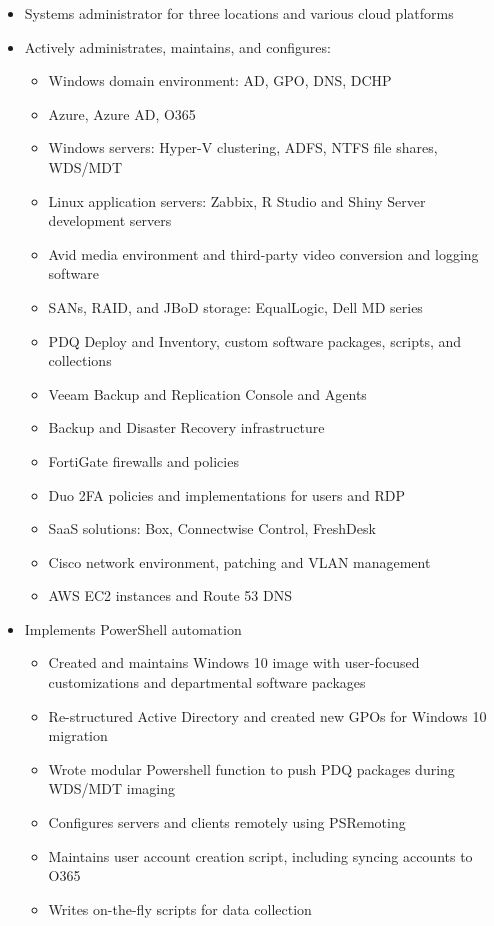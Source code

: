 \documentclass[centered]{res}
\begin{document}
\begin{resume}
\begin{itemize}
\item Systems administrator for three locations and various cloud platforms
\item Actively administrates, maintains, and configures:
	\begin{itemize}
		\item Windows domain environment: AD, GPO, DNS, DCHP
		\item Azure, Azure AD, O365 
		\item Windows servers: Hyper-V clustering, ADFS, NTFS file shares, WDS/MDT
		\item Linux application servers: Zabbix, R Studio and Shiny Server development servers
		\item Avid media environment and third-party video conversion and logging software
		\item SANs, RAID, and JBoD storage: EqualLogic, Dell MD series
		\item PDQ Deploy and Inventory, custom software packages, scripts, and collections
		\item Veeam Backup and Replication Console and Agents
		\item Backup and Disaster Recovery infrastructure
		\item FortiGate firewalls and policies
		\item Duo 2FA policies and implementations for users and RDP
		\item SaaS solutions: Box, Connectwise Control, FreshDesk
		\item Cisco network environment, patching and VLAN management		
		\item AWS EC2 instances and Route 53 DNS
	\end{itemize}
\item Implements PowerShell automation
	\begin{itemize}
	\item Created and maintains Windows 10 image with user-focused customizations and departmental software packages
	\item Re-structured Active Directory and created new GPOs for Windows 10 migration
	\item Wrote modular Powershell function to push PDQ packages during WDS/MDT imaging
	\item Configures servers and clients remotely using PSRemoting
	\item Maintains user account creation script, including syncing accounts to O365
	\item Writes on-the-fly scripts for data collection

\end{itemize}
\end{itemize}
\end{resume}
\end{document}
